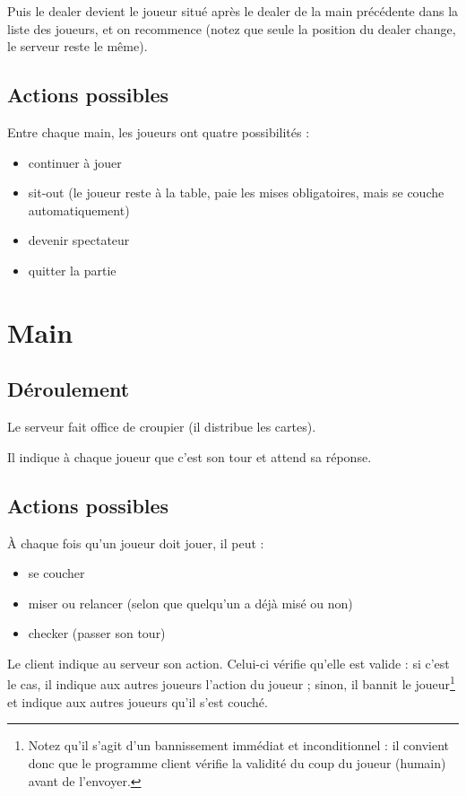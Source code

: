 Puis le dealer devient le joueur situé après le dealer de la main précédente dans la liste des joueurs, et on recommence (notez que seule la position du dealer change, le serveur reste le même).

\subsection{Actions possibles}

Entre chaque main, les joueurs ont quatre possibilités :
\begin{itemize}
	\item continuer à jouer
	\item sit-out (le joueur reste à la table, paie les mises obligatoires, mais se couche automatiquement)
	\item devenir spectateur
	\item quitter la partie
\end{itemize}

\section{Main}

\subsection{Déroulement}

Le serveur fait office de croupier (il distribue les cartes).

Il indique à chaque joueur que c'est son tour et attend sa réponse.

\subsection{Actions possibles}

À chaque fois qu'un joueur doit jouer, il peut :
\begin{itemize}
	\item se coucher
	\item miser ou relancer (selon que quelqu'un a déjà misé ou non)
	\item checker (passer son tour)
\end{itemize}

Le client indique au serveur son action.
Celui-ci vérifie qu'elle est valide : si c'est le cas, il indique aux autres joueurs l'action du joueur ; sinon, il bannit le joueur\footnote{Notez qu'il s'agit d'un bannissement immédiat et inconditionnel : il convient donc que le programme client vérifie la validité du coup du joueur (humain) avant de l'envoyer.} et indique aux autres joueurs qu'il s'est couché.

